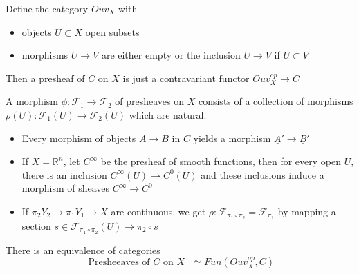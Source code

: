 \documentclass[../main.tex]{subfiles}
\begin{document}
\begin{rmq}
Define the category $Ouv_X $ with
\begin{itemize}
\item objects $U \subset X$ open subsets
\item morphisms $U \to V$ are either empty or the inclusion $U \to V$ if $U \subset V$ 
\end{itemize}
Then a presheaf of $C$ on $X$ is just a contravariant functor $ Ouv_X^{op}\to C$ 
\end{rmq}
\begin{defn}
	A morphism $\phi: \mathcal{F}_1 \to \mathcal{F}_2$ of presheaves on $X$ consists of a collection of morphisms $\rho( U) : \mathcal{F}_1( U) \to \mathcal{F}_2( U) $ which are natural.
\end{defn}
\begin{exemple}
\begin{itemize}
	\item Every morphism of objects $A \to B$ in $C$ yields a morphism $ \underline{A}' \to \underline{B}'$ 
	\item If $X = \mathbb{R}^{n}$, let $C^{ \infty }$ be the presheaf of smooth functions, then for every open $U$, there is an inclusion $C^{ \infty }( U) \to C^{0}( U) $ and these inclusions induce a morphism of sheaves $C^{ \infty }\to C^{0}$ 

	\item If $\pi_2 Y_2\to \pi_1 Y_1 \to X$ are continuous, we get $\rho: \mathcal{F}_{\pi_1\circ\pi_2} = \mathcal{F}_{\pi_1} $ by mapping a section $s \in \mathcal{F}_{\pi_1\circ\pi_2} ( U) \to \pi_2\circ s$ 
\end{itemize}
\end{exemple}
\begin{rmq}
There is an equivalence of categories 
\[ 
\text{ Presheeaves of $C$ on $X$  }  \simeq Fun( Ouv_X^{op},C) 
\]
\end{rmq}
\end{document}
